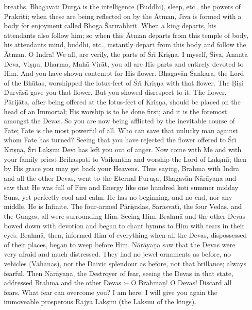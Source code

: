breaths, Bhagavat\={\i} Durg\=a is the intelligence (Buddhi), sleep, etc., the powers of Prakriti; when these are being reflected on by the \=Atman, J\={\i}va is formed with a body for enjoyment called Bhoga \'Sar\={\i}rabhrit. When a king departs, his attendants also follow him; so when this \=Atman departs from this temple of body, his attendants mind, buddhi, etc., instantly depart from this body and follow the \=Atman. O Indra! We all, are verily, the parts of \'Sr\={\i} Kri\d{s}\d{n}a. I myself, \'Siva, Ananta Deva, Vi\d{s}\d{n}u, Dharma, Mah\=a Vir\=at, you all are His parts and entirely devoted to Him. And you have shown contempt for His flower. Bhagav\=an \'Sankara, the Lord of the Bh\=utas, worshipped the lotus-feet of \'Sr\={\i} Kri\d{s}\d{n}a with that flower. The \d{R}i\d{s}i Durv\=as\=a gave you that flower. But you showed disrespect to it. The flower, P\=arij\=ata, after being offered at the lotus-feet of Kri\d{s}\d{n}a, should be placed on the head of an Immortal; His worship is to be done first; and it is the foremost amongst the Devas. So you are now being afflicted by the inevitable course of Fate; Fate is the most powerful of all. Who can save that unlucky man against whom Fate has turned? Seeing that you have rejected the flower offered to \'Sr\={\i} Kri\d{s}\d{n}a, \'Sr\={\i} Lak\d{s}m\={\i} Dev\={\i} has left you out of anger. Now come with Me and with your family priest Brihaspati to Vaikuntha and worship the Lord of Lak\d{s}m\={\i}; then by His grace you may get back your Heavens. Thus saying, Brahm\=a with Indra and all the other Devas, went to the Eternal Puru\d{s}a, Bhagav\=an N\=ar\=aya\d{n}a and saw that He was full of Fire and Energy like one hundred koti summer midday Suns, yet perfectly cool and calm. He has no beginning, and no end, nor any middle. He is Infinite. The four-armed P\=ari\d{s}adas, Sarasvat\={\i}, the four Vedas, and the Ganges, all were surrounding Him. Seeing Him, Brahm\=a and the other Devas bowed down with devotion and began to chant hymns to Him with tears in their eyes. Brahm\=a, then, informed Him of everything when all the Devas, dispossessed of their places, began to weep before Him. N\=ar\=aya\d{n}a saw that the Devas were very afraid and much distressed. They had no jewel ornaments as before, no vehicles (V\=ahanas), nor the Daivic splendour as before, not that brillance; always fearful. Then N\=ar\=aya\d{n}a, the Destroyer of fear, seeing the Devas in that state, addressed Brahm\=a and the other Devas :-- O Br\=ahma\d{n}! O Devas! Discard all fears. What fear can overcome you? I am here. I will give you again the immoveable prosperous R\=ajya Lak\d{s}m\={\i} (the Laksm\={\i} of the kings).

